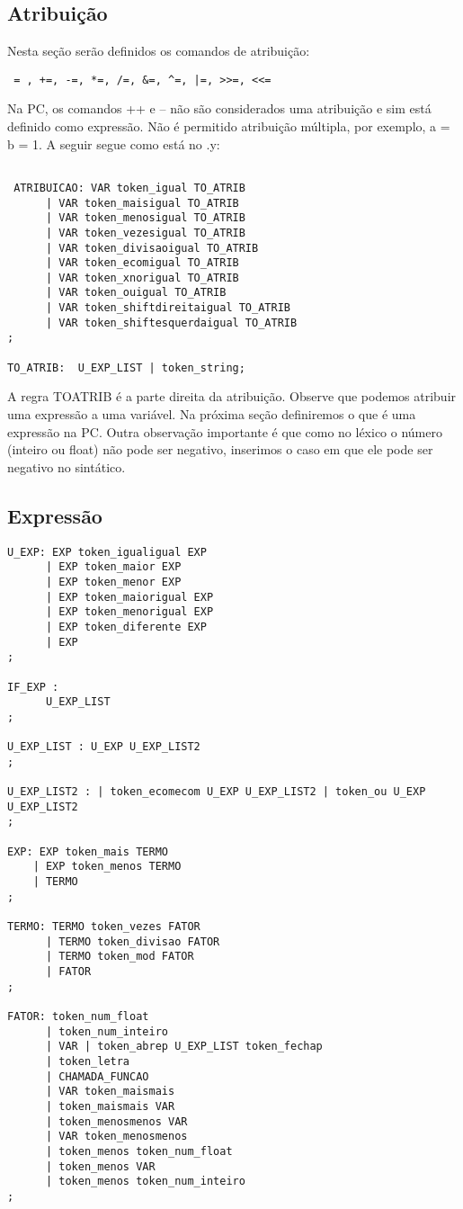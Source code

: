 \documentclass[a4paper,10pt]{article}
\begin{document}
\subsection{Atribuição}

Nesta seção serão definidos os comandos de atribuição:

\begin{verbatim}
 = , +=, -=, *=, /=, &=, ^=, |=, >>=, <<=
\end{verbatim}

Na PC, os comandos ++ e -- não são considerados uma atribuição e sim está definido como expressão. Não é permitido atribuição múltipla, por exemplo, a = b = 1. A seguir segue como está no .y:

\begin{verbatim}

 ATRIBUICAO: VAR token_igual TO_ATRIB
	  | VAR token_maisigual TO_ATRIB
	  | VAR token_menosigual TO_ATRIB
	  | VAR token_vezesigual TO_ATRIB
	  | VAR token_divisaoigual TO_ATRIB
	  | VAR token_ecomigual TO_ATRIB
	  | VAR token_xnorigual TO_ATRIB
	  | VAR token_ouigual TO_ATRIB
	  | VAR token_shiftdireitaigual TO_ATRIB
	  | VAR token_shiftesquerdaigual TO_ATRIB
;

TO_ATRIB:  U_EXP_LIST | token_string;

\end{verbatim}

A regra TOATRIB é a parte direita da atribuição. Observe que podemos atribuir uma expressão a uma variável. Na próxima seção definiremos o que é uma expressão na PC.
Outra observação importante é que como no léxico o número (inteiro ou float) não pode ser negativo, inserimos o caso em que ele pode ser negativo no sintático.

\subsection{Expressão}
\begin{verbatim}
U_EXP: EXP token_igualigual EXP
      | EXP token_maior EXP
      | EXP token_menor EXP
      | EXP token_maiorigual EXP
      | EXP token_menorigual EXP
      | EXP token_diferente EXP
      | EXP
;

IF_EXP :
      U_EXP_LIST
;

U_EXP_LIST : U_EXP U_EXP_LIST2
;

U_EXP_LIST2 : | token_ecomecom U_EXP U_EXP_LIST2 | token_ou U_EXP U_EXP_LIST2
;

EXP: EXP token_mais TERMO
    | EXP token_menos TERMO
    | TERMO
;

TERMO: TERMO token_vezes FATOR
      | TERMO token_divisao FATOR
      | TERMO token_mod FATOR
      | FATOR
;

FATOR: token_num_float 
	  | token_num_inteiro 
	  | VAR | token_abrep U_EXP_LIST token_fechap 
	  | token_letra 
	  | CHAMADA_FUNCAO
	  | VAR token_maismais
	  | token_maismais VAR
	  | token_menosmenos VAR
	  | VAR token_menosmenos
	  | token_menos token_num_float
	  | token_menos VAR
	  | token_menos token_num_inteiro
;

\end{verbatim}
\end{document}
